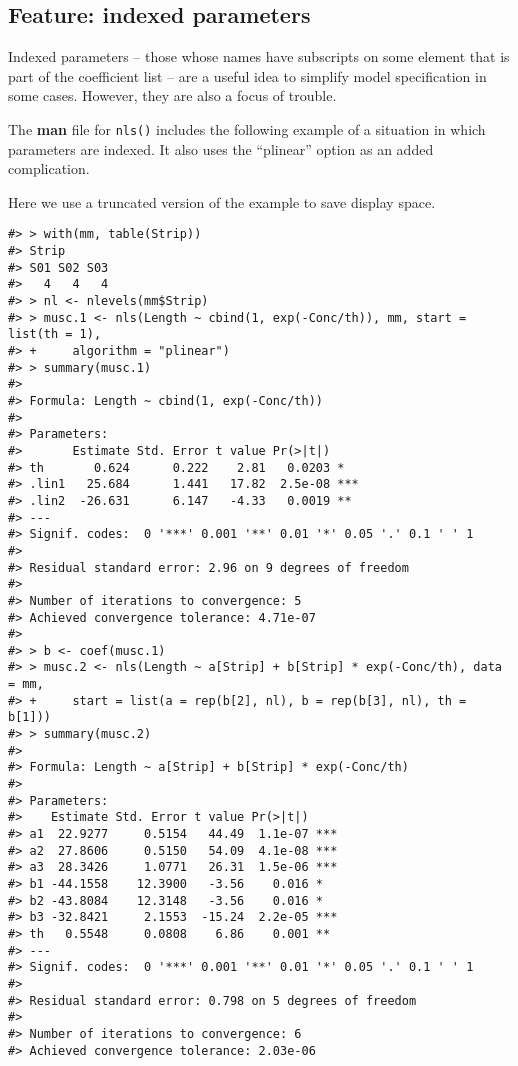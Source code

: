 \hypertarget{feature-indexed-parameters}{%
\subsection{Feature: indexed parameters}\label{feature-indexed-parameters}}

Indexed parameters -- those whose names have subscripts on some element that
is part of the coefficient list --
are a useful idea to simplify model specification in some cases. However, they
are also a focus of trouble.

The \textbf{man} file for \texttt{nls()} includes the following example of a situation in which
parameters are indexed. It also uses the ``plinear'' option as an added complication.

Here we use a truncated version of the example to save display space.

\begin{verbatim}
#> > with(mm, table(Strip))
#> Strip
#> S01 S02 S03 
#>   4   4   4 
#> > nl <- nlevels(mm$Strip)
#> > musc.1 <- nls(Length ~ cbind(1, exp(-Conc/th)), mm, start = list(th = 1), 
#> +     algorithm = "plinear")
#> > summary(musc.1)
#> 
#> Formula: Length ~ cbind(1, exp(-Conc/th))
#> 
#> Parameters:
#>       Estimate Std. Error t value Pr(>|t|)    
#> th       0.624      0.222    2.81   0.0203 *  
#> .lin1   25.684      1.441   17.82  2.5e-08 ***
#> .lin2  -26.631      6.147   -4.33   0.0019 ** 
#> ---
#> Signif. codes:  0 '***' 0.001 '**' 0.01 '*' 0.05 '.' 0.1 ' ' 1
#> 
#> Residual standard error: 2.96 on 9 degrees of freedom
#> 
#> Number of iterations to convergence: 5 
#> Achieved convergence tolerance: 4.71e-07
#> 
#> > b <- coef(musc.1)
#> > musc.2 <- nls(Length ~ a[Strip] + b[Strip] * exp(-Conc/th), data = mm, 
#> +     start = list(a = rep(b[2], nl), b = rep(b[3], nl), th = b[1]))
#> > summary(musc.2)
#> 
#> Formula: Length ~ a[Strip] + b[Strip] * exp(-Conc/th)
#> 
#> Parameters:
#>    Estimate Std. Error t value Pr(>|t|)    
#> a1  22.9277     0.5154   44.49  1.1e-07 ***
#> a2  27.8606     0.5150   54.09  4.1e-08 ***
#> a3  28.3426     1.0771   26.31  1.5e-06 ***
#> b1 -44.1558    12.3900   -3.56    0.016 *  
#> b2 -43.8084    12.3148   -3.56    0.016 *  
#> b3 -32.8421     2.1553  -15.24  2.2e-05 ***
#> th   0.5548     0.0808    6.86    0.001 ** 
#> ---
#> Signif. codes:  0 '***' 0.001 '**' 0.01 '*' 0.05 '.' 0.1 ' ' 1
#> 
#> Residual standard error: 0.798 on 5 degrees of freedom
#> 
#> Number of iterations to convergence: 6 
#> Achieved convergence tolerance: 2.03e-06
\end{verbatim}

